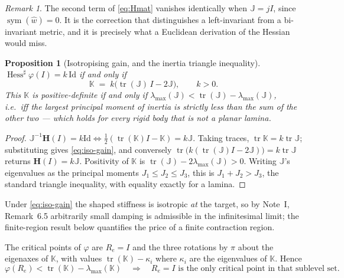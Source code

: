 \documentclass[11pt,a4paper]{article}
\newcommand{\Jm}{\mathbb{J}}
\newcommand{\Km}{\mathbb{K}}
\newcommand{\Hess}{\operatorname{Hess}}
\newcommand{\id}{\mathrm{Id}}
\newcommand{\sym}{\operatorname{sym}}
\newcommand{\tr}{\operatorname{tr}}
\theoremstyle{plain}
\newtheorem{proposition}[theorem]{Proposition}
\theoremstyle{definition}
\theoremstyle{remark}
\newtheorem{remark}[theorem]{Remark}
\begin{document}
\begin{remark}
The second term of \eqref{eq:Hmat} vanishes identically when $\Jm = jI$, since
$\sym(\hat w)=0$. It is the correction that distinguishes a left-invariant from a
bi-invariant metric, and it is precisely what a Euclidean derivation of the
Hessian would miss.
\end{remark}

\begin{proposition}[Isotropising gain, and the inertia triangle inequality]
\label{prop:isotropise}
$\Hess^{\sharp}\varphi(I) = k\,\id$ if and only if
\begin{equation}
  \Km \;=\; k\big(\tr(\Jm)\,I - 2\Jm\big),
  \qquad k>0 .
  \label{eq:iso-gain}
\end{equation}
This $\Km$ is positive-definite if and only if
$\lambda_{\max}(\Jm) < \tr(\Jm) - \lambda_{\max}(\Jm)$, i.e.\ iff the largest
principal moment of inertia is strictly less than the sum of the other two ---
which holds for every rigid body that is not a planar lamina.
\end{proposition}

\begin{proof}
$\Jm^{-1}\mathbf{H}(I) = k\id \iff \tfrac12(\tr(\Km)I-\Km) = k\Jm$. Taking traces,
$\tr\Km = k\tr\Jm$; substituting gives \eqref{eq:iso-gain}, and conversely
$\tr\big(k(\tr(\Jm)I-2\Jm)\big) = k\tr\Jm$ returns $\mathbf{H}(I) = k\Jm$. Positivity
of $\Km$ is $\tr(\Jm) - 2\lambda_{\max}(\Jm)>0$. Writing $\Jm$'s eigenvalues as the
principal moments $J_1\le J_2\le J_3$, this is $J_1+J_2>J_3$, the standard
triangle inequality, with equality exactly for a lamina.
\end{proof}

Under \eqref{eq:iso-gain} the shaped stiffness is isotropic \emph{at} the target,
so by Note~I, Remark~6.5 arbitrarily small damping is admissible in the
infinitesimal limit; the finite-region result below quantifies the price of a
finite contraction region.

The critical points of $\varphi$ are $R_e=I$ and the three rotations by $\pi$ about
the eigenaxes of $\Km$, with values $\tr(\Km)-\kappa_i$ where $\kappa_i$ are the
eigenvalues of $\Km$. Hence
\begin{equation}
  \varphi(R_e) < \tr(\Km) - \lambda_{\max}(\Km)
  \quad\Longrightarrow\quad
  R_e = I \text{ is the only critical point in that sublevel set}.
  \label{eq:crit}
\end{equation}

\end{document}
